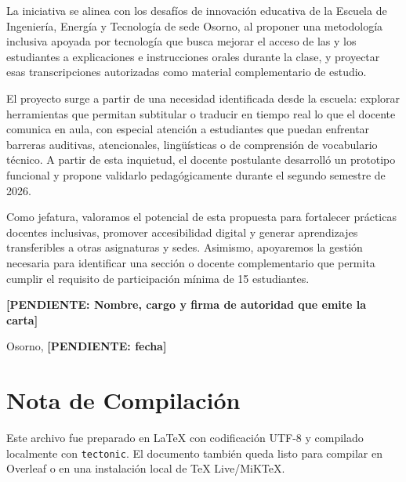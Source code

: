 \documentclass[11pt,letterpaper]{article}
\newcommand{\pending}[1]{\textcolor{PendingRed}{\textbf{[PENDIENTE: #1]}}}
\begin{document}
La iniciativa se alinea con los desafíos de innovación educativa de la Escuela de Ingeniería, Energía y Tecnología de sede Osorno, al proponer una metodología inclusiva apoyada por tecnología que busca mejorar el acceso de las y los estudiantes a explicaciones e instrucciones orales durante la clase, y proyectar esas transcripciones autorizadas como material complementario de estudio.

El proyecto surge a partir de una necesidad identificada desde la escuela: explorar herramientas que permitan subtitular o traducir en tiempo real lo que el docente comunica en aula, con especial atención a estudiantes que puedan enfrentar barreras auditivas, atencionales, lingüísticas o de comprensión de vocabulario técnico. A partir de esta inquietud, el docente postulante desarrolló un prototipo funcional y propone validarlo pedagógicamente durante el segundo semestre de 2026.

Como jefatura, valoramos el potencial de esta propuesta para fortalecer prácticas docentes inclusivas, promover accesibilidad digital y generar aprendizajes transferibles a otras asignaturas y sedes. Asimismo, apoyaremos la gestión necesaria para identificar una sección o docente complementario que permita cumplir el requisito de participación mínima de 15 estudiantes.

\vspace{1cm}
\pending{Nombre, cargo y firma de autoridad que emite la carta}

\vspace{0.5cm}
Osorno, \pending{fecha}

\section{Nota de Compilación}

Este archivo fue preparado en LaTeX con codificación UTF-8 y compilado localmente con \texttt{tectonic}. El documento también queda listo para compilar en Overleaf o en una instalación local de TeX Live/MiKTeX.
\end{document}

